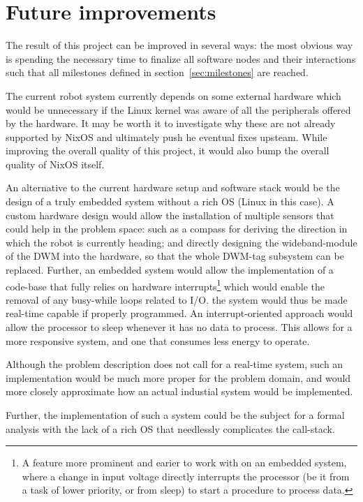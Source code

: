 \section{Future improvements}
The result of this project can be improved in several ways: the most
obvious way is spending the necessary time to finalize all software
nodes and their interactions such that all milestones defined in
section~\ref{sec:milestones} are reached.

The current robot system currently depends on some external hardware
which would be unnecessary if the Linux kernel was aware of all the
peripherals offered by the hardware. It may be worth it to investigate
why these are not already supported by NixOS and ultimately push he
eventual fixes upsteam. While improving the overall quality of this
project, it would also bump the overall quality of NixOS itself.

An alternative to the current hardware setup and software stack would be
the design of a truly embedded system without a rich OS (Linux in this
case). A custom hardware design would allow the installation of multiple
sensors that could help in the problem space: such as a compass for
deriving the direction in which the robot is currently heading; and
directly designing the wideband-module of the DWM into the hardware, so
that the whole DWM-tag subsystem can be replaced. Further, an embedded
system would allow the implementation of a code-base that fully relies
on hardware interrupts\footnote{A feature more prominent and earier to
  work with on an embedded system, where a change in input voltage
  directly interrupts the processor (be it from a task of lower
  priority, or from sleep) to start a procedure to process data.} which
would enable the removal of any busy-while loops related to I/O. the
system would thus be made real-time capable if properly programmed. An
interrupt-oriented approach would allow the processor to sleep whenever
it has no data to process. This allows for a more responsive system, and
one that consumes less energy to operate.

Although the problem description does not call for a real-time system,
such an implementation would be much more proper for the problem domain,
and would more closely approximate how an actual industial system would
be implemented.

Further, the implementation of such a system could be the subject for a
formal analysis with the lack of a rich OS that needlessly complicates
the call-stack.

